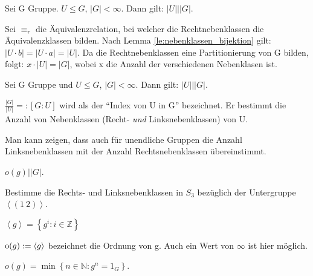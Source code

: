 \documentclass[10pt]{scrbook}
\begin{document}
\begin{Sa}
Sei G Gruppe. $U\leq G$, $\left|G\right|<\infty$. Dann gilt: $\left|U\right| | \left|G\right|$.
\end{Sa}
\begin{bew}
Sei $\equiv_r$ die Äquivalenzrelation, bei welcher die Rechtnebenklassen die Äquivalenzklassen bilden. Nach Lemma \ref{le:nebenklassen_bijektion} gilt: $\left|U\cdot b\right|=\left|U\cdot a\right|=\left|U\right|$. Da die Rechtnebenklassen eine Partitionierung von G bilden, folgt: $x\cdot\left|U\right|=\left|G\right|$, wobei x die Anzahl der verschiedenen Nebenklasen ist.
\end{bew}

\begin{Kor}
Sei G Gruppe und $U\leq G$, $\left|G\right|<\infty$. Dann gilt: $\left|U\right| | \left|G\right|$.
\end{Kor}

\begin{Def}
$\frac{\left|G\right|}{\left|U\right|}=:\left[G : U\right]$ wird als der "`Index von U in G"' bezeichnet. Er bestimmt die Anzahl von Nebenklassen (Recht- \emph{und} Linksnebenklassen) von U.
\end{Def}

\begin{Bem}
Man kann zeigen, dass auch für unendliche Gruppen die Anzahl Linksnebenklassen mit der Anzahl Rechtsnebenklassen übereinstimmt.
\end{Bem}

\begin{Kor}
$o(g)|\left|G\right|$.
\end{Kor}

\begin{Auf}
Bestimme die Rechts- und Linksnebenklassen in $S_3$ bezüglich der Untergruppe $\left\langle (1\ 2)\right\rangle$.
\end{Auf}

\begin{Le}\label{le:ordnung_g}$\left\langle g\right\rangle=\left\{g^i: i\in \mathbb{Z}\right\}$\end{Le}

\begin{Def}
\label{def:ordnung_g}
$\operatorname{o}(g):=\left\langle g\right\rangle$ bezeichnet die Ordnung von g. Auch ein Wert von $\infty$ ist hier möglich.
\end{Def}

\begin{Sa}
$o(g)=\min\left\{n\in \mathbb{N}: g^n=1_G\right\}$.
\end{Sa}
\end{document}
